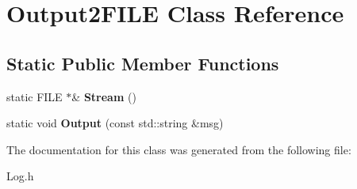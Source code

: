 \hypertarget{classOutput2FILE}{\section{\-Output2\-F\-I\-L\-E \-Class \-Reference}
\label{classOutput2FILE}
}
\subsection*{\-Static \-Public \-Member \-Functions}
\begin{DoxyCompactItemize}
\item 
\hypertarget{classOutput2FILE_a10f20b32157af0d88e5ad9710f2dbd6e}{static \-F\-I\-L\-E $\ast$\& {\bfseries \-Stream} ()}\label{classOutput2FILE_a10f20b32157af0d88e5ad9710f2dbd6e}

\item 
\hypertarget{classOutput2FILE_a4e36a13eb54de8a0c81a90156d66f021}{static void {\bfseries \-Output} (const std\-::string \&msg)}\label{classOutput2FILE_a4e36a13eb54de8a0c81a90156d66f021}

\end{DoxyCompactItemize}


\-The documentation for this class was generated from the following file\-:\begin{DoxyCompactItemize}
\item 
\-Log.\-h\end{DoxyCompactItemize}
